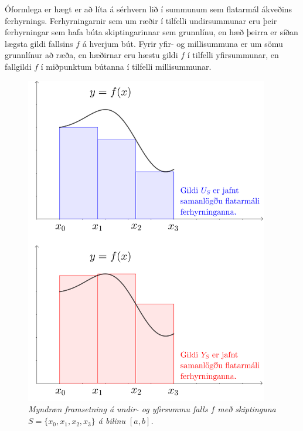 \begin{ath}
Óformlega er hægt er að líta á sérhvern lið í summunum sem flatarmál ákveðins ferhyrnings. Ferhyrningarnir sem um ræðir í tilfelli undirsummunar eru þeir ferhyrningar sem hafa búta skiptingarinnar sem grunnlínu, en hæð þeirra er síðan lægsta gildi fallsins $f$ á hverjum bút.  Fyrir yfir- og millisummuna er um sömu grunnlínur að ræða, en hæðirnar eru hæstu gildi $f$ í tilfelli yfirsummunar, en fallgildi $f$ í miðpunktum bútanna í tilfelli millisummunar.

\newpage

\begin{figure}[H]
\center
\includegraphics[width=0.95\textwidth]{Pictures/k2m6.png}
\caption{\it Myndræn framsetning á undir- og yfirsummu falls $f$ með skiptinguna $S = \{x_{0},x_{1},x_{2},x_{3}\}$ á bilinu $[a,b]$.}
\end{figure}

\newpage


\end{ath}
